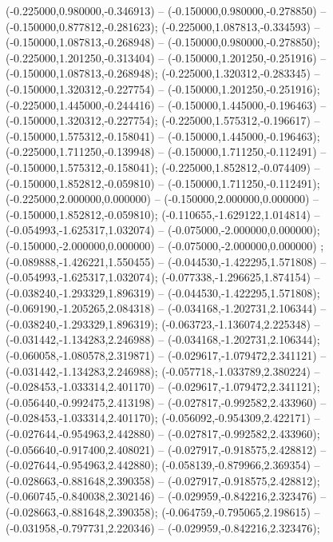  (-0.225000,0.980000,-0.346913) -- (-0.150000,0.980000,-0.278850) -- (-0.150000,0.877812,-0.281623);
 (-0.225000,1.087813,-0.334593) -- (-0.150000,1.087813,-0.268948) -- (-0.150000,0.980000,-0.278850);
 (-0.225000,1.201250,-0.313404) -- (-0.150000,1.201250,-0.251916) -- (-0.150000,1.087813,-0.268948);
 (-0.225000,1.320312,-0.283345) -- (-0.150000,1.320312,-0.227754) -- (-0.150000,1.201250,-0.251916);
 (-0.225000,1.445000,-0.244416) -- (-0.150000,1.445000,-0.196463) -- (-0.150000,1.320312,-0.227754);
 (-0.225000,1.575312,-0.196617) -- (-0.150000,1.575312,-0.158041) -- (-0.150000,1.445000,-0.196463);
 (-0.225000,1.711250,-0.139948) -- (-0.150000,1.711250,-0.112491) -- (-0.150000,1.575312,-0.158041);
 (-0.225000,1.852812,-0.074409) -- (-0.150000,1.852812,-0.059810) -- (-0.150000,1.711250,-0.112491);
 (-0.225000,2.000000,0.000000) -- (-0.150000,2.000000,0.000000) -- (-0.150000,1.852812,-0.059810);
 (-0.110655,-1.629122,1.014814) -- (-0.054993,-1.625317,1.032074) -- (-0.075000,-2.000000,0.000000);
 (-0.150000,-2.000000,0.000000) -- (-0.075000,-2.000000,0.000000) ;
 (-0.089888,-1.426221,1.550455) -- (-0.044530,-1.422295,1.571808) -- (-0.054993,-1.625317,1.032074);
 (-0.077338,-1.296625,1.874154) -- (-0.038240,-1.293329,1.896319) -- (-0.044530,-1.422295,1.571808);
 (-0.069190,-1.205265,2.084318) -- (-0.034168,-1.202731,2.106344) -- (-0.038240,-1.293329,1.896319);
 (-0.063723,-1.136074,2.225348) -- (-0.031442,-1.134283,2.246988) -- (-0.034168,-1.202731,2.106344);
 (-0.060058,-1.080578,2.319871) -- (-0.029617,-1.079472,2.341121) -- (-0.031442,-1.134283,2.246988);
 (-0.057718,-1.033789,2.380224) -- (-0.028453,-1.033314,2.401170) -- (-0.029617,-1.079472,2.341121);
 (-0.056440,-0.992475,2.413198) -- (-0.027817,-0.992582,2.433960) -- (-0.028453,-1.033314,2.401170);
 (-0.056092,-0.954309,2.422171) -- (-0.027644,-0.954963,2.442880) -- (-0.027817,-0.992582,2.433960);
 (-0.056640,-0.917400,2.408021) -- (-0.027917,-0.918575,2.428812) -- (-0.027644,-0.954963,2.442880);
 (-0.058139,-0.879966,2.369354) -- (-0.028663,-0.881648,2.390358) -- (-0.027917,-0.918575,2.428812);
 (-0.060745,-0.840038,2.302146) -- (-0.029959,-0.842216,2.323476) -- (-0.028663,-0.881648,2.390358);
 (-0.064759,-0.795065,2.198615) -- (-0.031958,-0.797731,2.220346) -- (-0.029959,-0.842216,2.323476);
